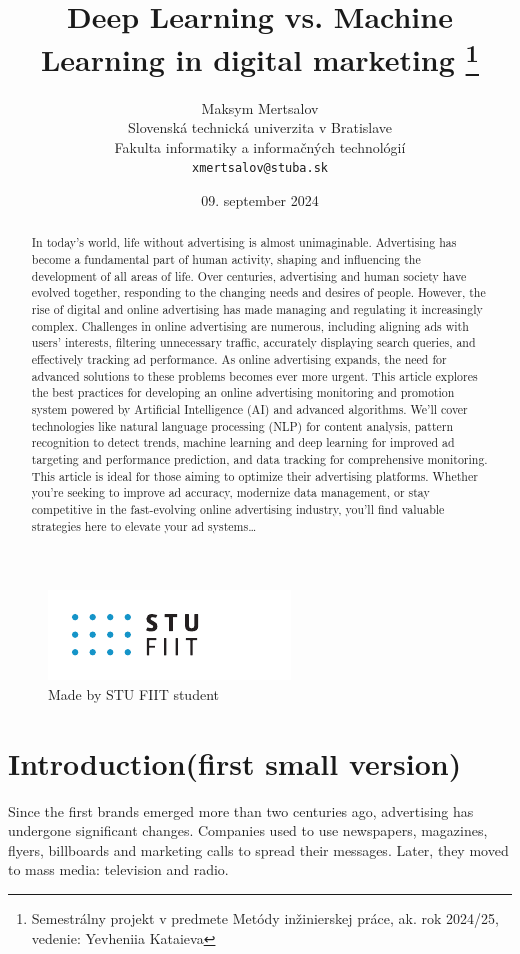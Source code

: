 \documentclass[10pt,twoside,a4paper,english]{article}
\title{Deep Learning vs. Machine Learning in digital marketing \thanks{Semestrálny projekt v predmete Metódy inžinierskej práce, ak. rok 2024/25, vedenie: Yevheniia Kataieva}} %
\author{Maksym Mertsalov\\[2pt]
{\small Slovenská technická univerzita v Bratislave}\\
{\small Fakulta informatiky a informačných technológií}\\
{\small \texttt{xmertsalov@stuba.sk}}
}
\date{\small 09. september 2024} %
\begin{document}
	\maketitle

	\begin{figure}[tbh]
		\centering
		\includegraphics[scale=0.8]{logo_fiit.pdf}
		\caption{Made by STU FIIT student}
	\end{figure}

	\begin{abstract}
		In today’s world, life without advertising is almost unimaginable. Advertising has become a fundamental part of human activity, shaping and influencing the development of all areas of life. Over centuries, advertising and human society have evolved together, responding to the changing needs and desires of people. However, the rise of digital and online advertising has made managing and regulating it increasingly complex.
		Challenges in online advertising are numerous, including aligning ads with users' interests, filtering unnecessary traffic, accurately displaying search queries, and effectively tracking ad performance. As online advertising expands, the need for advanced solutions to these problems becomes ever more urgent.
		This article explores the best practices for developing an online advertising monitoring and promotion system powered by Artificial Intelligence (AI) and advanced algorithms. We’ll cover technologies like natural language processing (NLP) for content analysis, pattern recognition to detect trends, machine learning and deep learning for improved ad targeting and performance prediction, and data tracking for comprehensive monitoring.
		This article is ideal for those aiming to optimize their advertising platforms. Whether you're seeking to improve ad accuracy, modernize data management, or stay competitive in the fast-evolving online advertising industry, you'll find valuable strategies here to elevate your ad systems\ldots
	\end{abstract}



	\section{Introduction(first small version)}
	\begingroup
	Since the first brands emerged more than two centuries ago, advertising has undergone significant changes. Companies used to use newspapers, magazines, flyers, billboards and marketing calls to spread their messages. Later, they moved to mass media: television and radio.\par
\end{document}
